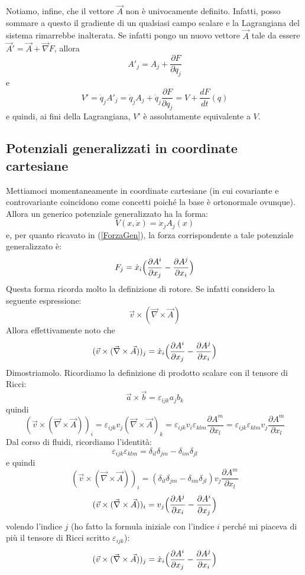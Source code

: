 \documentclass[a4paper,openany]{article}
\begin{document}
	Notiamo, infine, che il vettore $\vec{A}$ non è univocamente definito. Infatti, posso sommare a questo il gradiente di un qualsiasi campo scalare e la Lagrangiana del sistema rimarrebbe inalterata. Se infatti pongo un nuovo vettore $\vec{A}$ tale da essere $\vec{A}' = \vec{A}+\vec{\nabla}F$, allora
	$$
	A'_j = A_j + \dfrac{\partial F}{\partial q_j}
	$$
	e
	$$
	V' = \dot{q}_j A'_j = \dot{q}_j A_j  + \dot{q}_j\dfrac{\partial F}{\partial q_j} = V + \dfrac{dF}{dt}(q)
	$$
	e quindi, ai fini della Lagrangiana, $V'$ è assolutamente equivalente a $V$.
	\subsection{Potenziali generalizzati in coordinate cartesiane}
	Mettiamoci momentaneamente in coordinate cartesiane (in cui covariante e controvariante coincidono come concetti poiché la base è ortonormale ovunque). Allora un generico potenziale generalizzato ha la forma:
	$$
	V(x,\dot{x}) = \dot{x}_j A_j(x)
	$$
	e, per quanto ricavato in (\ref{ForzaGen}), la forza corrispondente a tale potenziale generalizzato è:
	$$
	F_j = \dot{x}_i \Bigl(\dfrac{\partial A^i}{\partial x_j} -\dfrac{\partial A^j}{\partial x_i}\Bigl)
	$$
	Questa forma ricorda molto la definizione di rotore. Se infatti considero la seguente espressione:
	$$
	\vec{v} \times (\vec{\nabla}\times \vec{A})
	$$
	Allora effettivamente noto che
	$$
	(\vec{v} \times (\vec{\nabla}\times \vec{A}))_j = \dot{x}_i \Bigl(\dfrac{\partial A^i}{\partial x_j} -\dfrac{\partial A^j}{\partial x_i}\Bigl) 
	$$
	Dimostriamolo. Ricordiamo la definizione di prodotto scalare con il tensore di Ricci:
	$$
	\vec{a}\times \vec{b} = \varepsilon_{ijk}a_jb_k
	$$
	quindi
	$$
	(\vec{v} \times (\vec{\nabla}\times \vec{A}))_i = \varepsilon_{ijk}v_j(\vec{\nabla}\times \vec{A})_k = \varepsilon_{ijk}v_i \varepsilon_{klm}\dfrac{\partial A^{m}}{\partial x_l}= \varepsilon_{ijk}\varepsilon_{klm}v_j \dfrac{\partial A^{m}}{\partial x_l}
	$$
	Dal corso di fluidi, ricordiamo l'identità:
	$$
	\varepsilon_{ijk}\varepsilon_{klm} = \delta_{il}\delta_{jm}-\delta_{im}\delta_{jl}
	$$
	e quindi
	$$
		(\vec{v} \times (\vec{\nabla}\times \vec{A}))_i =( \delta_{il}\delta_{jm}-\delta_{im}\delta_{jl})v_j \dfrac{\partial A^{m}}{\partial x_l}
	$$	
	$$
	(\vec{v} \times (\vec{\nabla}\times \vec{A}))_i =v_j\Bigl( \dfrac{\partial A^{j}}{\partial x_i}- \dfrac{\partial A^{i}}{\partial x_j}\Bigl)
	$$	
	volendo l'indice $j$ (ho fatto la formula iniziale con l'indice $i$ perché mi piaceva di più il tensore di Ricci scritto $\varepsilon_{ijk}$):
$$
(\vec{v} \times (\vec{\nabla}\times \vec{A}))_j = \dot{x}_i \Bigl(\dfrac{\partial A^i}{\partial x_j} -\dfrac{\partial A^j}{\partial x_i}\Bigl) 
$$
\end{document}

